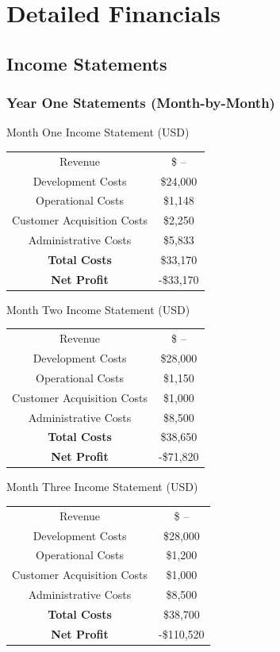 \documentclass[12pt]{article}
\begin{document}
\section{Detailed Financials}
\subsection{Income Statements}
\vspace{.75cm}
\subsubsection{Year One Statements (Month-by-Month)}
\begin{center}
	Month One Income Statement (USD) \\[1.5ex]
	
	\begin{tabular}{c | c}
	Revenue & \$ -- \\
	Development Costs & \$24,000 \\
	Operational Costs & \$1,148 \\
	Customer Acquisition Costs & \$2,250 \\
	Administrative Costs & \$5,833 \\
	\textbf{Total Costs} & \$33,170 \\
	\textbf{Net Profit} & -\$33,170
	\end{tabular}
\end{center}
\vspace{1.5cm}
\begin{center}
	Month Two Income Statement (USD) \\[1.5ex]
	
	\begin{tabular}{c | c}
	Revenue & \$ -- \\
	Development Costs & \$28,000 \\
	Operational Costs & \$1,150 \\
	Customer Acquisition Costs & \$1,000 \\
	Administrative Costs & \$8,500 \\
	\textbf{Total Costs} & \$38,650 \\
	\textbf{Net Profit} & -\$71,820
	\end{tabular}
\end{center}
\vspace{1.5cm}
\begin{center}
	Month Three Income Statement (USD) \\[1.5ex]
	
	\begin{tabular}{c | c}
	Revenue & \$ -- \\
	Development Costs & \$28,000 \\
	Operational Costs & \$1,200 \\
	Customer Acquisition Costs & \$1,000 \\
	Administrative Costs & \$8,500 \\
	\textbf{Total Costs} & \$38,700 \\
	\textbf{Net Profit} & -\$110,520
	\end{tabular}
\end{center}
\end{document}
